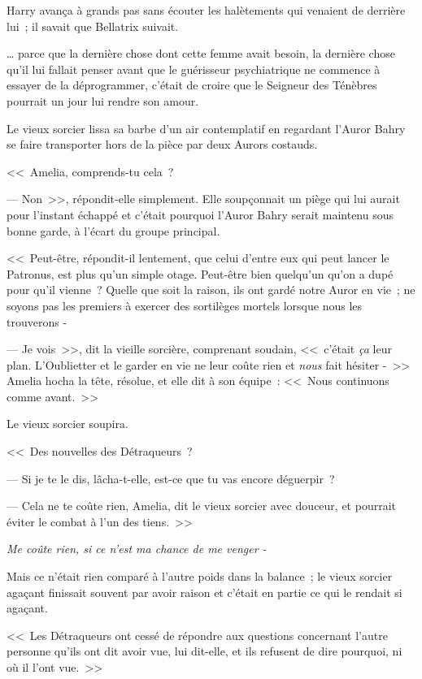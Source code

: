 Harry avança à grands pas sans écouter les halètements qui venaient de derrière lui~; il savait que Bellatrix suivait.

… parce que la dernière chose dont cette femme avait besoin, la dernière chose qu'il lui fallait penser avant que le guérisseur psychiatrique ne commence à essayer de la déprogrammer, c'était de croire que le Seigneur des Ténèbres pourrait un jour lui rendre son amour.

\later

Le vieux sorcier lissa sa barbe d'un air contemplatif en regardant l'Auror Bahry se faire transporter hors de la pièce par deux Aurors costauds.

<<~Amelia, comprends-tu cela~?

--- Non~>>, répondit-elle simplement. Elle soupçonnait un piège qui lui aurait pour l'instant échappé et c'était pourquoi l'Auror Bahry serait maintenu sous bonne garde, à l'écart du groupe principal.

<<~Peut-être, répondit-il lentement, que celui d'entre eux qui peut lancer le Patronus, est plus qu'un simple otage. Peut-être bien quelqu'un qu'on a dupé pour qu'il vienne~? Quelle que soit la raison, ils ont gardé notre Auror en vie~; ne soyons pas les premiers à exercer des sortilèges mortels lorsque nous les trouverons -

--- Je vois~>>, dit la vieille sorcière, comprenant soudain, <<~c'était \emph{ça} leur plan. L'Oublietter et le garder en vie ne leur coûte rien et \emph{nous} fait hésiter -~>> Amelia hocha la tête, résolue, et elle dit à son équipe~: <<~Nous continuons comme avant.~>>

Le vieux sorcier soupira.

<<~Des nouvelles des Détraqueurs~?

--- Si je te le dis, lâcha-t-elle, est-ce que tu vas encore déguerpir~?

--- Cela ne te coûte rien, Amelia, dit le vieux sorcier avec douceur, et pourrait éviter le combat à l'un des tiens.~>>

\emph{Me coûte rien, si ce n'est ma chance de me venger -}

Mais ce n'était rien comparé à l'autre poids dans la balance~; le vieux sorcier agaçant finissait souvent par avoir raison et c'était en partie ce qui le rendait si agaçant.

<<~Les Détraqueurs ont cessé de répondre aux questions concernant l'autre personne qu'ils ont dit avoir vue, lui dit-elle, et ils refusent de dire pourquoi, ni où il l'ont vue.~>>

